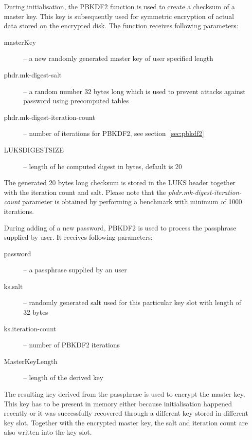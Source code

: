 \documentclass[nolof]{fithesis3}
\begin{document}
During initialisation, the PBKDF2 function is used to create a checksum of a master key. This key is subsequently used for symmetric encryption of actual data stored on the encrypted disk. The function receives following parameters:

\begin{description}
\item[masterKey] -- a new randomly generated master key of user specified length

\item[phdr.mk-digest-salt] -- a random number 32 bytes long which is used to prevent attacks against password using precomputed tables \parencite[see][section 5.6.3]{itmc14}

\item[phdr.mk-digest-iteration-count] -- number of iterations for PBKDF2, see section~\ref{sec:pbkdf2}

\item[LUKS\-DIGEST\-SIZE] -- length of he computed digest in bytes, default is 20
\end{description}

The generated 20 bytes long checksum is stored in the LUKS header together with the iteration count and salt. Please note that the \emph{phdr.mk-digest-iteration-count} parameter is obtained by performing a benchmark with minimum of 1000 iterations.

During adding of a new password, PBKDF2 is used to process the passphrase supplied by user. It receives following parameters:

\begin{description}
\item[password] -- a passphrase supplied by an user

\item[ks.salt] -- randomly generated salt used for this particular key slot with length of 32 bytes

\item[ks.iteration-count] -- number of PBKDF2 iterations

\item[MasterKeyLength] -- length of the derived key
\end{description}

The resulting key derived from the passphrase is used to encrypt the master key. This key has to be present in memory either because initialisation happened recently or it was successfully recovered through a different key stored in different key slot. Together with the encrypted master key, the salt and iteration count are also written into the key slot.
\end{document}
